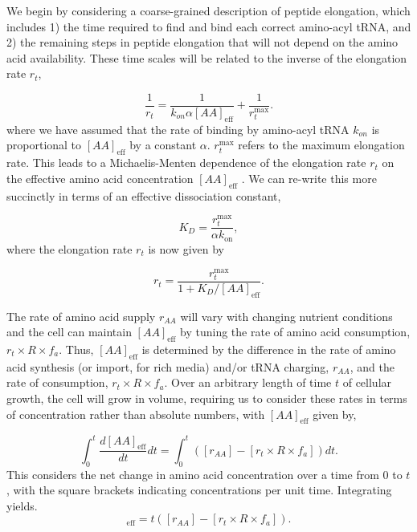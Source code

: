 We begin by considering a coarse-grained description of peptide elongation,
which includes 1) the time required to find and bind each correct amino-acyl
tRNA, and 2) the remaining steps in peptide elongation that will not depend on
the amino acid availability. These time scales will be related to the inverse of the
elongation rate $r_t$,

\begin{equation}
\frac{1}{r_t} = \frac{1}{k_{on} \alpha [AA]_{\text{eff}}} + \frac{1}{r_{t}^{\text{max}}}.
\end{equation}
where we have assumed that the rate of binding by amino-acyl tRNA $k_{on}$ is
proportional to $[AA]_{\text{eff}}$ by a constant $\alpha$. $r_{t}^{\text{max}}$
refers to the maximum elongation rate. This leads to a Michaelis-Menten
dependence of the elongation rate $r_t$ on the effective amino acid
concentration $[AA]_{\text{eff}}$ \citep{klumpp2013, dai2016}.
We can re-write this more succinctly in terms of an effective dissociation
constant,

\begin{equation}
    K_D = \frac{r_{t}^{\text{max}}}{\alpha k_\text{on}},
\end{equation}
where the elongation rate $r_t$ is now given by

\begin{equation}
r_t = \frac{r_{t}^{\text{max}}}{1 + K_D/[AA]_{\text{eff}}}.
\label{eq:rt_kd_simple}
\end{equation}

The rate of amino acid supply $r_{AA}$ will vary with changing nutrient
conditions and the cell can maintain $[AA]_{\text{eff}}$ by tuning the rate of
amino acid consumption, $r_t \times R \times f_a$.  Thus, $[AA]_{\text{eff}}$ is
determined by the difference in the rate of amino acid synthesis (or import, for
rich media) and/or tRNA charging,  $r_{AA}$, and the rate of consumption,
$r_t\times R \times f_a$. Over an  arbitrary length of time $t$ of cellular
growth, the cell will grow in volume, requiring us to consider these rates in
terms of concentration rather than absolute numbers, with $[AA]_{\text{eff}}$
given by,

\begin{equation}
\int_{0}^{t} \frac{d[AA]_{\text{eff}}}{dt} dt =  \int_{0}^{t}([r_{AA}] - [r_t\times R \times f_a]) dt.
\label{eq:aaeff_int}
\end{equation}
This considers the net change in amino acid concentration over a time from 0 to
$t$, with the square brackets indicating concentrations per unit time.
Integrating  yields.
\begin{equation}
[AA]_{\text{eff}} =  t([r_{AA}] - [r_t \times R \times f_a]).
\label{eq:aaeff_concs}
\end{equation}

